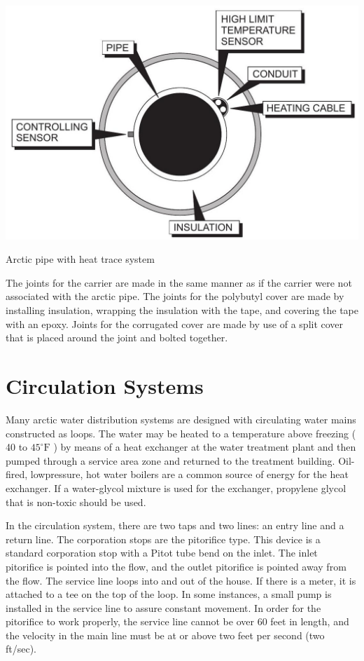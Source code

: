 \documentclass[10pt]{article}
\begin{document}
\includegraphics[max width=\textwidth]{2022_11_03_fc0cbc2f3612fab6edd2g-34}

Arctic pipe with heat trace system

The joints for the carrier are made in the same manner as if the carrier were not associated with the arctic pipe. The joints for the polybutyl cover are made by installing insulation, wrapping the insulation with the tape, and covering the tape with an epoxy. Joints for the corrugated cover are made by use of a split cover that is placed around the joint and bolted together.

\section{Circulation Systems}
Many arctic water distribution systems are designed with circulating water mains constructed as loops. The water may be heated to a temperature above freezing ( 40 to $45^{\circ} \mathrm{F}$ ) by means of a heat exchanger at the water treatment plant and then pumped through a service area zone and returned to the treatment building. Oil-fired, lowpressure, hot water boilers are a common source of energy for the heat exchanger. If a water-glycol mixture is used for the exchanger, propylene glycol that is non-toxic should be used.

In the circulation system, there are two taps and two lines: an entry line and a return line. The corporation stops are the pitorifice type. This device is a standard corporation stop with a Pitot tube bend on the inlet. The inlet pitorifice is pointed into the flow, and the outlet pitorifice is pointed away from the flow. The service line loops into and out of the house. If there is a meter, it is attached to a tee on the top of the loop. In some instances, a small pump is installed in the service line to assure constant movement. In order for the pitorifice to work properly, the service line cannot be over 60 feet in length, and the velocity in the main line must be at or above two feet per second (two ft/sec).
\end{document}
